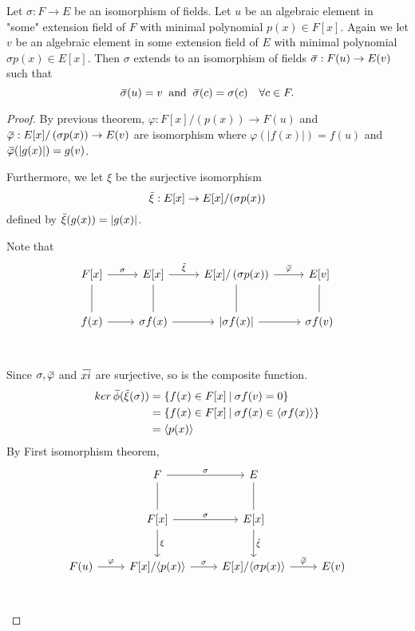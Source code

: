 \begin{corollary}
    Let $\sigma : F \to E$ be an isomorphism of fields. Let $u$ be an algebraic element in 
    "some" extension field of $F$ with minimal polynomial $p(x) \in F[x]$. Again we let 
    $v$ be an algebraic element in some extension field of $E$ with minimal polynomial 
    $\sigma p(x) \in E[x]$. Then $\sigma$ extends to an isomorphism of fields 
    $\,\overline{\!{\sigma}} : F(u) \to E(v)$ such that 
    \[
        \,\overline{\!{\sigma}}(u) = v \> \text{ and } \> \,\overline{\!{\sigma}}(c) = \sigma(c) \quad \forall c \in F.
    \]
\end{corollary}
\begin{proof}
    By previous theorem, $\varphi:F[x]/\left( p(x) \right) \to F(u)$ and
    $\,\overline{\!{\varphi}}:E[x]/\left( \sigma p(x) \right) \to E(v)$ are isomorphism where 
    $\varphi(|f(x)|) = f(u)$ and $\,\overline{\!{\varphi}}(|g(x)|) = g(v)$.

    Furthermore, we let $\xi $ be the surjective isomorphism
    \[
        \,\overline{\!{\xi}}: E[x] \to E[x]/(\sigma p(x))
    \]
    defined by $\,\overline{\!{\xi}}(g(x)) = |g(x)|$.
    
    Note that
    \[
        \begin{tikzcd}[row sep=2.5em]
            F[x] \arrow[r, "\sigma"] \arrow[dash]{d} & E[x] \arrow[r, "\olsi{\xi}"] \arrow[dash]{d} & E[x] / \left( \sigma p(x)\right) \arrow[r, "\olsi{\varphi}"] \arrow[dash]{d}& E[v] \arrow[dash]{d}\\
            f(x) \arrow[r] & \sigma f(x) \arrow[r] & \left| \sigma f(x) \right| \arrow[r] & \sigma f(v)\\
        \end{tikzcd}
    \]
    Since $\sigma, \,\overline{\!{\varphi}}$ and $\,\overline{\!{xi}}$ are surjective, so is the composite function.
    \begin{align*}
        ker\, \,\overline{\!{\phi}}(\,\overline{\!{\xi}}(\sigma)) &= 
        \{ f(x) \in F[x] \> | \> \sigma f(v) = 0 \}\\
        &= \{ f(x) \in F[x] \> | \> \sigma f(x) \in \langle \sigma f(x) \rangle \}\\
        &= \langle p(x) \rangle
    \end{align*}
    By First isomorphism theorem,
    \[
        \begin{tikzcd}[row sep=2.5em]
            & F \arrow[r, "\sigma"] \arrow[dash]{d} & E \arrow[dash]{d} & \\
            & F[x] \arrow[r, "\sigma"] \arrow[d, "\xi"] & E[x] \arrow[d, "\olsi{\xi}"] & \\  
            F(u) \arrow[r, "\varphi"] & F[x] / \langle p(x) \rangle \arrow[r, "\sigma"] & E[x] / \langle \sigma p(x)\rangle \arrow[r, "\olsi{\varphi}"] & E(v)\\
        \end{tikzcd}
    \]
\end{proof}


